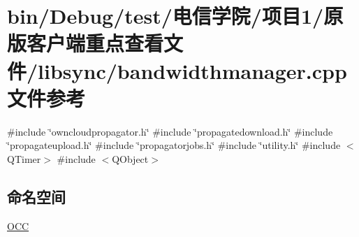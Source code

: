 \hypertarget{_xE5_x8E_x9F_xE7_x89_x88_xE5_xAE_xA2_xE6_x88_xB7_xE7_xAB_xAF_xE9_x87_x8D_xE7_x82_xB9_xE6_x9F_xA5296405ac2b86b81b9ba83de8514adb13}{}\section{bin/\+Debug/test/电信学院/项目1/原版客户端重点查看文件/libsync/bandwidthmanager.cpp 文件参考}
\label{_xE5_x8E_x9F_xE7_x89_x88_xE5_xAE_xA2_xE6_x88_xB7_xE7_xAB_xAF_xE9_x87_x8D_xE7_x82_xB9_xE6_x9F_xA5296405ac2b86b81b9ba83de8514adb13}
{\ttfamily \#include \char`\"{}owncloudpropagator.\+h\char`\"{}}\newline
{\ttfamily \#include \char`\"{}propagatedownload.\+h\char`\"{}}\newline
{\ttfamily \#include \char`\"{}propagateupload.\+h\char`\"{}}\newline
{\ttfamily \#include \char`\"{}propagatorjobs.\+h\char`\"{}}\newline
{\ttfamily \#include \char`\"{}utility.\+h\char`\"{}}\newline
{\ttfamily \#include $<$Q\+Timer$>$}\newline
{\ttfamily \#include $<$Q\+Object$>$}\newline
\subsection*{命名空间}
\begin{DoxyCompactItemize}
\item 
 \hyperlink{namespace_o_c_c}{O\+CC}
\end{DoxyCompactItemize}
